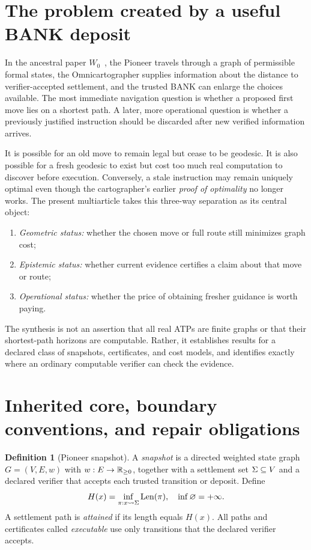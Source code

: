 \documentclass[11pt]{article}
\theoremstyle{definition}\newtheorem{definition}[theorem]{Definition}\newtheorem{assumption}[theorem]{Assumption}
\theoremstyle{remark}\newtheorem{remark}[theorem]{Remark}
\begin{document}
\section{The problem created by a useful BANK deposit}
\label{sec:question}
In the ancestral paper $W_0$~\cite{W0}, the Pioneer travels through a graph of permissible formal states, the Omnicartographer supplies information about the distance to verifier-accepted settlement, and the trusted BANK can enlarge the choices available. The most immediate navigation question is whether a proposed first move lies on a shortest path. A later, more operational question is whether a previously justified instruction should be discarded after new verified information arrives.

It is possible for an old move to remain legal but cease to be geodesic. It is also possible for a fresh geodesic to exist but cost too much real computation to discover before execution. Conversely, a stale instruction may remain uniquely optimal even though the cartographer's earlier \emph{proof of optimality} no longer works. The present multiarticle takes this three-way separation as its central object:
\begin{enumerate}[label=(\roman*),leftmargin=2.4em]
\item \emph{Geometric status:} whether the chosen move or full route still minimizes graph cost;
\item \emph{Epistemic status:} whether current evidence certifies a claim about that move or route;
\item \emph{Operational status:} whether the price of obtaining fresher guidance is worth paying.
\end{enumerate}
The synthesis is not an assertion that all real ATPs are finite graphs or that their shortest-path horizons are computable. Rather, it establishes results for a declared class of snapshots, certificates, and cost models, and identifies exactly where an ordinary computable verifier can check the evidence.

\section{Inherited core, boundary conventions, and repair obligations}
\label{sec:inherit}
\begin{definition}[Pioneer snapshot]
A \emph{snapshot} is a directed weighted state graph $G=(V,E,w)$ with $w:E\to\mathbb R_{\geq0}$, together with a settlement set $\Sigma\subseteq V$ and a declared verifier that accepts each trusted transition or deposit. Define
\[
H(x)=\inf_{\pi:x\leadsto\Sigma}\operatorname{Len}(\pi),\quad \inf\varnothing=+\infty.
\]
A settlement path is \emph{attained} if its length equals $H(x)$. All paths and certificates called \emph{executable} use only transitions that the declared verifier accepts.
\end{definition}
\end{document}
